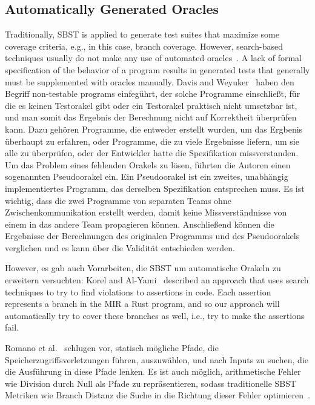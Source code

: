 \documentclass{article}
\begin{document}
\subsection{Automatically Generated Oracles} 
\label{sec:generated-oracles}
Traditionally, \ac{SBST} is applied to generate test suites that maximize some coverage criteria, e.g., in this case, branch coverage. However, search-based techniques usually do not make any use of automated oracles~\cite{Fraser2013}. A lack of formal specification of the behavior of a program results in generated tests that generally must be supplemented with oracles manually. Davis and Weyuker~\cite{10.1145/800175.809889} haben den Begriff non-testable programs einfegührt, der solche Programme einschließt, für die es keinen Testorakel gibt oder ein Testorakel praktisch nicht umsetzbar ist, und man somit das Ergebnis der Berechnung nicht auf Korrektheit überprüfen kann. Dazu gehören Programme, die entweder erstellt wurden, um das Ergbenis überhaupt zu erfahren, oder Programme, die zu viele Ergebnisse liefern, um sie alle zu überprüfen, oder der Entwickler hatte die Spezifikation missverstanden. Um das Problem eines fehlenden Orakels zu lösen, führten die Autoren einen sogenannten Pseudoorakel ein. Ein Pseudoorakel ist ein zweites, unabhängig implementiertes Programm, das derselben Spezifikation entsprechen muss. Es ist wichtig, dass die zwei Programme von separaten Teams ohne Zwischenkommunikation erstellt werden, damit keine Missverständnisse von einem in das andere Team propagieren können. Anschließend können die Ergebnisse der Berechnungen des originalen Programms und des Pseudoorakels verglichen und es kann über die Validität entschieden werden.

However, es gab auch Vorarbeiten, die \ac{SBST} um automatische Orakeln zu erweitern versuchten: Korel and Al-Yami~\cite{Korel1996} described an approach that uses search techniques to try to find violations to assertions in code. Each assertion represents a branch in the \ac{MIR} a Rust program, and so our approach will automatically try to cover these branches as well, i.e., try to make the assertions fail. 

Romano et al.~\cite{Romano2011} schlugen vor, statisch mögliche Pfade, die Speicherzugriffsverletzungen führen, auszuwählen, und nach Inputs zu suchen, die die Ausführung in diese Pfade lenken. Es ist auch möglich, arithmetische Fehler wie Division durch Null als Pfade zu repräsentieren, sodass traditionelle \ac{SBST} Metriken wie Branch Distanz die Suche in die Richtung dieser Fehler optimieren~\cite{Bhattacharya2011}. 
\end{document}
